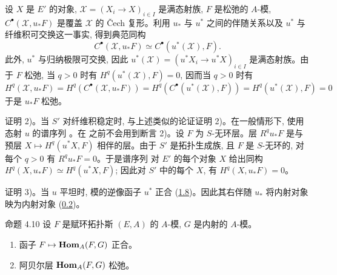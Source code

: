 设 $X$ 是 $E'$ 的对象, $𝒳=(X_i\to X)_{i\in I}$ 是满态射族, $F$ 是松弛的 $A$-模, $C^{∙}(𝒳,u_\ast F)$ 是覆盖 $𝒳$ 的 Čech 复形。利用 $u_\ast$ 与 $u^\ast$ 之间的伴随关系以及 $u^\ast$ 与纤维积可交换这一事实, 得到典范同构
$$
C^{∙}(𝒳,u_\ast F)\simeq C^{∙}(u^\ast(𝒳),F).
$$
此外, $u^\ast$ 与归纳极限可交换, 因此 $u^\ast(𝒳)=(u^\ast X_i\to u^\ast X)_{i\in I}$ 是满态射族。由于 $F$ 松弛, 当 $q>0$ 时有 $H^q(u^\ast(𝒳),F)=0$, 因而当 $q>0$ 时有
$$
H^q(𝒳,u_\ast F)=H^q(C^{∙}(𝒳,u_\ast F))
=H^q(C^{∙}(u^\ast(𝒳),F))=H^q(u^\ast(𝒳),F)=0
$$
于是 $u_\ast F$ 松弛。

证明 2)。当 $S'$ 对纤维积稳定时, 与上述类似的论证证明 2)。在一般情形下, 使用态射 $u$ 的谱序列 。在\pageoriginale {} 之前不会用到断言 2)。设 $F$ 为 $S$-无环层。层 $R^qu_\ast F$ 是与预层 $X\mapsto H^q(u^\ast X,F)$ 相伴的层。由于 $S'$ 是拓扑生成族, 且 $F$ 是 $S$-无环的, 对每个 $q>0$ 有 $R^qu_\ast F=0$。于是谱序列  对 $E'$ 的每个对象 $X$ 给出同构 $H^q(X,u_\ast F)\simeq H^q(u^\ast X,F)$; 因此对 $S'$ 中的每个 $X$, 有 $H^q(X,u_\ast F)=0$。

证明 3)。当 $u$ 平坦时, 模的逆像函子 $u^\ast$ 正合 (\hyperref[V.def1.8]{1.8})。因此其右伴随 $u_\ast$ 将内射对象映为内射对象 (\hyperref[V.prop0.2]{0.2})。

\begin{enonce*}{命题 4.10}
设 $F$ 是赋环拓扑斯 $(E,A)$ 的 $A$-模, $G$ 是内射的 $A$-模。
\begin{enumerate}
\renewcommand{\labelenumi}{\theenumi)}
\item 函子 $F\mapsto\operatorname{\mathbf{Hom}}_A(F,G)$ 正合。

\item 阿贝尔层 $\operatorname{\mathbf{Hom}}_A(F,G)$ 松弛。
\end{enumerate}
\end{enonce*}

